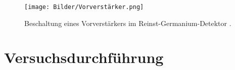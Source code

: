 \begin{figure}
  \centering
  \texttt{[image: Bilder/Vorverstärker.png]}
  \caption{Beschaltung eines Vorverstärkers im Reinst-Germanium-Detektor \cite{V18}.}
  \label{fig:Vorverstärker}
\end{figure}
















\section{Versuchsdurchführung}

